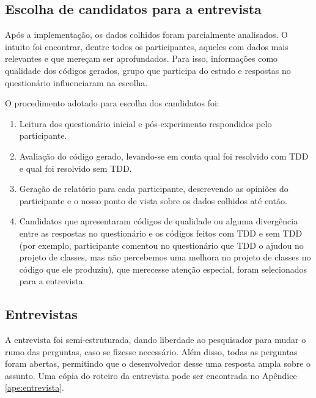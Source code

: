 \subsection{Escolha de candidatos para a entrevista}

Após a implementação, os dados colhidos foram parcialmente analisados. O intuito
foi encontrar, dentre todos os participantes, aqueles com dados mais relevantes
e que mereçam ser aprofundados.
Para isso, informações como qualidade dos códigos gerados, grupo que participa
do estudo e respostas no questionário influenciaram na escolha.

O procedimento adotado para escolha dos candidatos foi:

\begin{enumerate}
	\item Leitura dos questionário inicial e pós-experimento respondidos pelo participante.
	
	\item Avaliação do código gerado, levando-se em conta qual foi resolvido com
	TDD e qual foi resolvido sem TDD.
	
	\item Geração de relatório para cada participante, descrevendo as opiniões do participante
	e o nosso ponto de vista sobre os dados colhidos até então.
	
	\item Candidatos que apresentaram códigos de qualidade ou alguma divergência entre as respostas
	no questionário e os códigos feitos com TDD e sem TDD 
	(por exemplo, participante comentou no questionário que TDD o ajudou no projeto de classes,
	mas não percebemos uma melhora no projeto de classes no código que ele produziu), que merecesse
	atenção especial, foram selecionados para a entrevista.
\end{enumerate}

\subsection{Entrevistas}
\label{sec:planejamento-estrategia-entrevistas}

A entrevista foi semi-estruturada, dando liberdade ao
pesquisador para mudar o rumo das perguntas, caso se fizesse necessário.
Além disso, todas as perguntas foram abertas, permitindo que o desenvolvedor desse
uma resposta ampla sobre o assunto. Uma cópia do roteiro da entrevista pode ser encontrada
no Apêndice \ref{ape:entrevista}.


